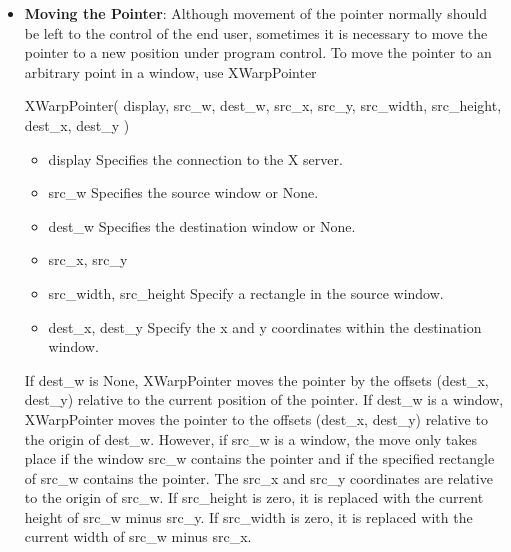 \documentclass{report}
\begin{document}
\begin{itemize}
            \bigbreak \noindent 
            XAllowEvents can generate a BadValue error.
            \bigbreak \noindent 
            ReplayKeyboard and ReplayPointer mean: “Cancel my active grab, then re-process the event that caused the freeze as if my grab had not intercepted it.”
            \bigbreak \noindent 
            They are used when you grabbed an input event, looked at it, and decided not to consume it.
        \item \textbf{Moving the Pointer}: Although movement of the pointer normally should be left to the control of the end user, sometimes it is necessary to move the pointer to a new position under program control.
            \bigbreak \noindent 
            To move the pointer to an arbitrary point in a window, use XWarpPointer
            \bigbreak \noindent 
            \begin{cppcode}
                XWarpPointer(
                    display,
                    src_w, dest_w,
                    src_x, src_y, 
                    src_width, src_height,
                    dest_x, dest_y
                )
            \end{cppcode}
            \begin{itemize}
                \item display Specifies the connection to the X server.
                \item src\_w Specifies the source window or None.
                \item dest\_w Specifies the destination window or None.
                \item src\_x, src\_y
                \item src\_width, src\_height Specify a rectangle in the source window.
                \item dest\_x, dest\_y Specify the x and y coordinates within the destination window.
            \end{itemize}
            If dest\_w is None, XWarpPointer moves the pointer by the offsets (dest\_x, dest\_y) relative to the current position of the pointer. If dest\_w is a window, XWarpPointer moves the pointer to the offsets (dest\_x, dest\_y) relative to the origin of dest\_w. However, if src\_w is a window, the move only takes place if the window src\_w contains the pointer and if the specified rectangle of src\_w contains the pointer.
            \bigbreak \noindent 
            The src\_x and src\_y coordinates are relative to the origin of src\_w. If src\_height is zero, it is replaced with the current height of src\_w minus src\_y. If src\_width is zero, it is replaced with the current width of src\_w minus src\_x.

\end{itemize}
\end{document}
